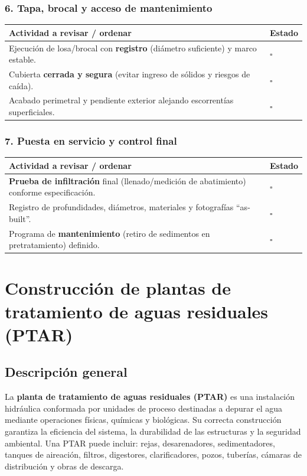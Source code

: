 \documentclass[12pt]{article}
\newcommand{\cbox}{\(\square\)} %
\begin{document}
	\subsubsection*{6. Tapa, brocal y acceso de mantenimiento}
	\begin{tabularx}{\linewidth}{>{\raggedright\arraybackslash}p{0.93\linewidth} >{\centering\arraybackslash}m{0.07\linewidth}}
		\toprule
		\textbf{Actividad a revisar / ordenar} & \textbf{Estado}\\
		\midrule
		Ejecución de losa/brocal con \textbf{registro} (diámetro suficiente) y marco estable. & \cbox \\
		Cubierta \textbf{cerrada y segura} (evitar ingreso de sólidos y riesgos de caída). & \cbox \\
		Acabado perimetral y pendiente exterior alejando escorrentías superficiales. & \cbox \\
		\bottomrule
	\end{tabularx}
	
	\subsubsection*{7. Puesta en servicio y control final}
	\begin{tabularx}{\linewidth}{>{\raggedright\arraybackslash}p{0.93\linewidth} >{\centering\arraybackslash}m{0.07\linewidth}}
		\toprule
		\textbf{Actividad a revisar / ordenar} & \textbf{Estado}\\
		\midrule
		\textbf{Prueba de infiltración} final (llenado/medición de abatimiento) conforme especificación. & \cbox \\
		Registro de profundidades, diámetros, materiales y fotografías “as-built”. & \cbox \\
		Programa de \textbf{mantenimiento} (retiro de sedimentos en pretratamiento) definido. & \cbox \\
		\bottomrule
	\end{tabularx}
	
	
	
	
	
	
	
	\section{Construcción de plantas de tratamiento de aguas residuales (PTAR)}
	
	\subsection*{Descripción general}
	La \textbf{planta de tratamiento de aguas residuales (PTAR)} es una instalación hidráulica conformada por unidades de proceso destinadas a depurar el agua mediante operaciones físicas, químicas y biológicas.  
	Su correcta construcción garantiza la eficiencia del sistema, la durabilidad de las estructuras y la seguridad ambiental.  
	Una PTAR puede incluir: rejas, desarenadores, sedimentadores, tanques de aireación, filtros, digestores, clarificadores, pozos, tuberías, cámaras de distribución y obras de descarga.
	
\end{document}
